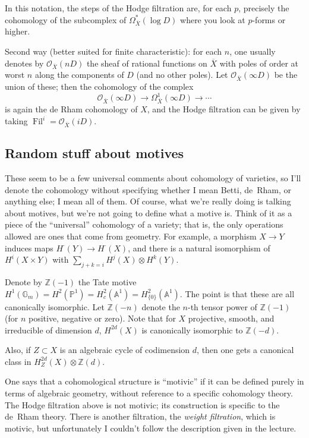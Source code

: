 \documentclass[12pt]{article}
\def\AAA{\mathbb{A}}
\def\GG{\mathbb{G}}
\def\PP{\mathbb{P}}
\def\ZZ{\mathbb{Z}}
\def\calO{\mathcal{O}}
\DeclareMathOperator{\Fil}{Fil}
\begin{document}
In this notation, the steps of the Hodge filtration are, for each $p$,
precisely the cohomology of the subcomplex of 
$\Omega^*_{\overline{X}}(\log D)$ where you look at $p$-forms or higher.

Second way (better suited for finite characteristic): 
for each $n$, one usually denotes by $\calO_{\overline{X}}(nD)$ the sheaf of
rational functions on $\overline{X}$ with poles of order at worst $n$ along the
components of $D$ (and no other poles). Let $\calO_{\overline{X}}(\infty D)$
be the union of these; then the cohomology of the complex
\[
\calO_{\overline{X}}(\infty D) \to \Omega^1_{\overline{X}}(\infty D) \to \cdots
\]
is again the de Rham cohomology of $X$, and the Hodge filtration
can be given by taking $\Fil^i = \calO_{\overline{X}}(i D)$.

\subsection*{Random stuff about motives}

These seem to be a few universal comments about cohomology of varieties,
so I'll denote the cohomology without specifying whether I mean Betti,
de~Rham, or anything else; I mean all of them. Of course, what we're really
doing is talking about motives, but we're not going to define what a motive is.
Think of it as a piece of the ``universal'' cohomology of a variety; that is,
the only operations allowed are ones that come from geometry. For
example, a morphism $X \to Y$ induces maps $H^{\cdot}(Y) \to H^{\cdot}(X)$,
and there is a natural isomorphism of $H^{i}(X \times Y)$ with
$\sum_{j+k=i} H^j(X) \otimes H^k(Y)$.

Denote by $\ZZ(-1)$ the Tate motive $H^1(\GG_m) = H^2(\PP^1)
= H^2_c(\AAA^1) = H^2_{\{0\}}(\AAA^1)$. The point is that these are all
canonically isomorphic. Let $\ZZ(-n)$ denote the $n$-th tensor power of 
$\ZZ(-1)$ (for $n$ positive, negative or zero).
Note that for $X$ projective, smooth, and irreducible
of dimension $d$, $H^{2d}(X)$ is canonically isomorphic to $\ZZ(-d)$.

Also, if $Z \subset X$ is an algebraic cycle of codimension $d$, then
one gets a canonical class in $H^{2d}_Z(X) \otimes \ZZ(d)$.

One says that a cohomological structure is ``motivic'' if it can be defined
purely in terms of algebraic geometry, without reference to a specific
cohomology theory. The Hodge filtration above is not motivic; its construction
is specific to the de~Rham theory. There is another filtration, the
\emph{weight filtration}, which is motivic, but unfortunately I couldn't
follow the description given in the lecture.
\end{document}
